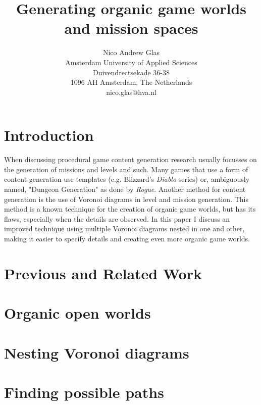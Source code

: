 \documentclass[9pt,a4paper,twocolumn,draft]{article}
\title{\textbf{Generating organic game worlds and mission spaces}}
\author{ \small Nico Andrew Glas \\ \small Amsterdam University of Applied Sciences \\ \small Duivendrectsekade 36-38 \\ \small 1096 AH Amsterdam, The Netherlands \\ \small nico.glas@hva.nl}
\begin{document}
\maketitle  

\begin{abstract}

\end{abstract}

\section{Introduction}
When discussing procedural game content generation research usually focusses on the generation of missions and levels and such. Many games that use a form of content generation use templates (e.g. Blizzard's \emph{Diablo} series) or, ambiguously named, "Dungeon Generation" as done by \emph{Rogue}. Another method for content generation is the use of Voronoi diagrams in level and mission generation. This method is a known technique for the creation of organic game worlds, but has its flaws, especially when the details are observed. In this paper I discuss an improved technique using multiple Voronoi diagrams nested in one and other, making it easier to specify details and creating even more organic game worlds.

\section{Previous and Related Work}

\section{Organic open worlds}

\section{Nesting Voronoi diagrams}

\section{Finding possible paths}
\end{document}
